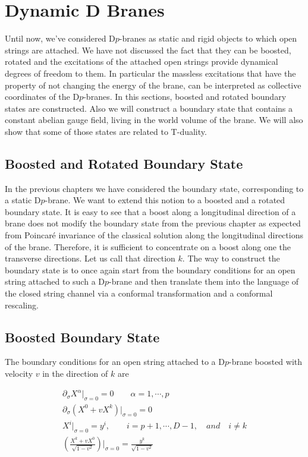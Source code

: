\section{Dynamic D Branes}

Until now, we've considered D$p$-branes as static and rigid objects to which open strings are attached. We have not discussed the fact that they can be boosted, rotated and the excitations of the attached open strings provide dynamical degrees of freedom to them.\cite{DBRANES2} In particular the massless excitations that have the property of not changing the energy of the brane, can be interpreted as collective coordinates of the D$p$-branes. In this sections, boosted and rotated boundary states are constructed. Also we will construct a boundary state that contains a constant abelian gauge field, living in the world volume of the brane. We will also show that some of those states are related to T-duality.

\subsection{Boosted and Rotated Boundary State}
In the previous chapters we have considered the boundary state, corresponding to a static D$p$-brane. We want to extend this notion to a boosted and a rotated boundary state. It is easy to see that a boost along a longitudinal direction of a brane does not modify the boundary state from the previous chapter as expected from Poincaré invariance of the classical solution along the longitudinal directions of the brane. Therefore, it is sufficient to concentrate on a boost along one the transverse directions. Let us call that direction $k$. The way to construct the boundary state is to once again start from the boundary conditions for an open string attached to such a D$p$-brane and then translate them into the language of the closed string channel via a conformal transformation and a conformal rescaling.
\subsection{Boosted Boundary State}
\par The boundary conditions for an open string attached to a D$p$-brane boosted with velocity $v$ in the direction of $k$ are\cite{Bachas95}

\begin{gather}
\partial_\sigma X^\alpha\vert_{\sigma=0} = 0\quad\quad\alpha = 1,\cdots{},p \\
\partial_\sigma\left(X^0 + vX^k\right)\vert_{\sigma=0} = 0 \\
X^i\vert_{\sigma=0} = y^i,\quad\quad i=p+1,\cdots{},D-1, \quad and\quad i\neq k \\
\left(\frac{X^k+vX^0}{\sqrt{1-v^2}}\right)\vert_{\sigma=0} = \frac{y^k}{\sqrt{1-v^2}}
\end{gather} 

